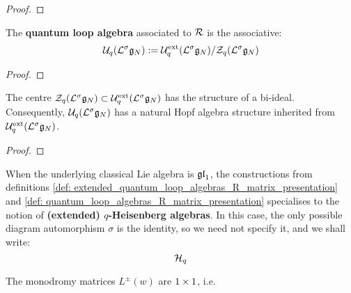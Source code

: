         \begin{lemma}
            
        \end{lemma}
            \begin{proof}
                
            \end{proof}
        \begin{definition} \label{def: quantum_loop_algebras_R_matrix_presentation}
            The \textbf{quantum loop algebra} associated to $\mathcal{R}$ is the associative:
                $$\mathcal{U}_q(\mathcal{L}^{\sigma}\mathfrak{g}_N) := \mathcal{U}_q^{\mathrm{ext}}(\mathcal{L}^{\sigma}\mathfrak{g}_N)/\mathcal{Z}_q(\mathcal{L}^{\sigma}\mathfrak{g}_N)$$
        \end{definition}

        \begin{lemma} \label{lemma: hopf_structure_on_extended_quantum_loop_algebras}
            
        \end{lemma}
            \begin{proof}
                
            \end{proof}
        \begin{corollary} \label{coro: hopf_structure_on_quantum_loop_algebras}
            The centre $\mathcal{Z}_q(\mathcal{L}^{\sigma}\mathfrak{g}_N) \subset \mathcal{U}_q^{\mathrm{ext}}(\mathcal{L}^{\sigma}\mathfrak{g}_N)$ has the structure of a bi-ideal. Consequently, $\mathcal{U}_q(\mathcal{L}^{\sigma}\mathfrak{g}_N)$ has a natural Hopf algebra structure inherited from $\mathcal{U}_q^{\mathrm{ext}}(\mathcal{L}^{\sigma}\mathfrak{g}_N)$.
        \end{corollary}
            \begin{proof}
                
            \end{proof}
        \begin{example} \label{example: (extended)_q_heisenberg_algebras_R_matrix_presentation}
            When the underlying classical Lie algebra is $\mathfrak{gl}_1$, the constructions from definitions \ref{def: extended_quantum_loop_algebras_R_matrix_presentation} and \ref{def: quantum_loop_algebras_R_matrix_presentation} specialises to the notion of \textbf{(extended) $q$-Heisenberg algebras}. In this case, the only possible diagram automorphism $\sigma$ is the identity, so we need not specify it, and we shall write:
                $$\mathcal{H}_q$$
            
            The monodromy matrices $L^{\pm}(w)$ are $1 \x 1$, i.e. 
        \end{example}


